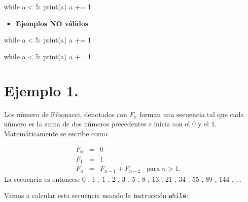 \documentclass[
  letterpaper,
  DIV=11,
  numbers=noendperiod]{scrreprt}
\newenvironment{Shaded}{\begin{snugshade}}{\end{snugshade}}
\newcommand{\BuiltInTok}[1]{\textcolor[rgb]{0.00,0.23,0.31}{#1}}
\newcommand{\ControlFlowTok}[1]{\textcolor[rgb]{0.00,0.23,0.31}{#1}}
\newcommand{\DecValTok}[1]{\textcolor[rgb]{0.68,0.00,0.00}{#1}}
\newcommand{\NormalTok}[1]{\textcolor[rgb]{0.00,0.23,0.31}{#1}}
\newcommand{\OperatorTok}[1]{\textcolor[rgb]{0.37,0.37,0.37}{#1}}
\providecommand{\tightlist}{%
  \setlength{\itemsep}{0pt}\setlength{\parskip}{0pt}}\usepackage{longtable,booktabs,array}
\begin{document}
\begin{Shaded}
\begin{Highlighting}[]
\ControlFlowTok{while}\NormalTok{ a }\OperatorTok{\textless{}} \DecValTok{5}\NormalTok{: }
        \BuiltInTok{print}\NormalTok{(a)}
\NormalTok{        a }\OperatorTok{+=} \DecValTok{1}
\end{Highlighting}
\end{Shaded}

\begin{itemize}
\tightlist
\item
  \textbf{Ejemplos NO válidos}
\end{itemize}

\begin{Shaded}
\begin{Highlighting}[]
\ControlFlowTok{while}\NormalTok{ a }\OperatorTok{\textless{}} \DecValTok{5}\NormalTok{: }
 \BuiltInTok{print}\NormalTok{(a)}
\NormalTok{   a }\OperatorTok{+=} \DecValTok{1}
\end{Highlighting}
\end{Shaded}

\begin{Shaded}
\begin{Highlighting}[]
\ControlFlowTok{while}\NormalTok{ a }\OperatorTok{\textless{}} \DecValTok{5}\NormalTok{: }
\BuiltInTok{print}\NormalTok{(a)}
\NormalTok{a }\OperatorTok{+=} \DecValTok{1}
\end{Highlighting}
\end{Shaded}

\section{\texorpdfstring{\textbf{Ejemplo
1.}}{Ejemplo 1.}}\label{ejemplo-1.-1}

Los número de Fibonacci, denotados con \(F_n\) forman una secuencia tal
que cada número es la suma de dos números precedentes e inicia con el 0
y el 1. Matemáticamente se escribe como:

\[
\begin{eqnarray}
F_0 & = & 0 \\
F_1 & = & 1 \\
F_n & = & F_{n − 1} + F_{n − 2} \;\;\; \text{para} \; n > 1.
\end{eqnarray}
\] La secuencia es entonces: 0 , 1 , 1 , 2 , 3 , 5 , 8 , 13 , 21 , 34 ,
55 , 89 , 144 , \(\ldots\)

Vamos a calcular esta secuencia usando la instrucción \texttt{while}:
\end{document}
